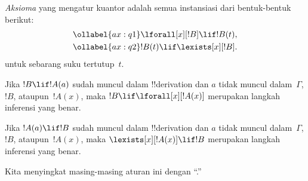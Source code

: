 \documentclass[../../../include/open-logic-section]{subfiles}
\begin{document}


\begin{defn}
\emph{Aksioma} yang mengatur kuantor adalah semua instansiasi dari
bentuk-bentuk berikut:
\begin{align}
\ollabel{ax:q1} & \lforall[x][!B] \lif !B(t), \\
\ollabel{ax:q2} & !B(t) \lif \lexists[x][!B].
\end{align}
untuk sebarang suku tertutup~$t$.
\end{defn}

\begin{defn}
\item Jika $!B \lif !A(a)$ sudah muncul dalam !!{derivation} dan $a$
  tidak muncul dalam~$\Gamma$, $!B$, ataupun~$!A(x)$, maka $!B \lif
  \lforall[x][!A(x)]$ merupakan langkah inferensi yang benar.
\item Jika $!A(a) \lif !B$ sudah muncul dalam !!{derivation} dan $a$
  tidak muncul dalam~$\Gamma$, $!B$, ataupun~$!A(x)$, maka
  $\lexists[x][!A(x)] \lif !B$ merupakan langkah inferensi yang benar.
\end{defn}

Kita menyingkat masing-masing aturan ini dengan ``\QR.''
\end{document}
